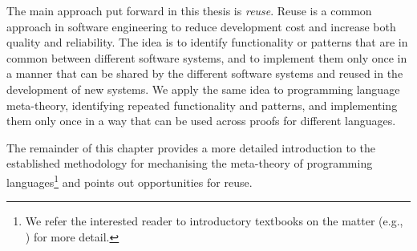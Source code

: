 {The main approach put forward in this thesis is \emph{reuse}. Reuse is a common
approach in software engineering to reduce development cost and increase both
quality and reliability. The idea is to identify functionality or patterns that
are in common between different software systems, and to implement them only
once in a manner that can be shared by the different software systems and reused
in the development of new systems. We apply the same idea to programming
language meta-theory, identifying repeated functionality and patterns, and
implementing them only once in a way that can be used across proofs for
different languages.

% 

The remainder of this chapter provides a more detailed introduction to the
established methodology for mechanising the meta-theory of programming
languages\footnote{We refer the interested reader to introductory textbooks on
  the matter (e.g., \cite{tapl}) for more detail.} and points out opportunities
for reuse.



}
